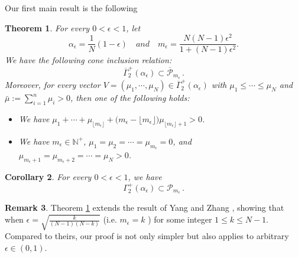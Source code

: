 \documentclass[12pt, twoside]{article}
\newtheorem{theorem}{Theorem}[section]
\newtheorem{corollary}[theorem]{Corollary}
\theoremstyle{definition}
\newtheorem{definition}[theorem]{Definition}
\newtheorem{remark}[theorem]{Remark}
\numberwithin{equation}{section}
\def \a {\alpha }
\begin{document}
Our first main result is the following
\begin{theorem}\label{T1}
For every $0<\epsilon<1$, let
$$\a_{\epsilon}=\frac{1}{N}(1-\epsilon)\quad and\quad m_{\epsilon} =\frac{N(N-1)\epsilon^2}{1+(N-1)\epsilon^2}.$$
We have the following cone inclusion relation:
\begin{equation*}
\overline{\Gamma}^{+}_{2}(\alpha_{\epsilon})\subset \overline{\mathcal{P}}_{m_{\epsilon}}\,.
\end{equation*}
Moreover, for every vector $V=(\mu_{1},\cdots,\mu_{N})\in \overline{\Gamma}^{+}_{2}(\alpha_{\epsilon})$ with $\mu_{1}\leq\cdots\leq\mu_{N}$ and $\bar{\mu}:=\sum_{i=1}^{n}\mu_{i}>0$, then one of the following holds:
\begin{itemize}
\item[(1)] We have $\mu_{1}+\cdots+\mu_{\lfloor  m_{\epsilon}\rfloor}+\big(m_{\epsilon}-\lfloor m_{\epsilon}\rfloor\big)\mu_{\lfloor m_{\epsilon}\rfloor+1}> 0$.
\item[(2)] We have $m_{\epsilon}\in\mathbb{N}^{+}$, $\mu_{1}=\mu_{2}=\cdots=\mu_{ m_{\epsilon} }=0$, and $\mu_{ m_{\epsilon} +1}=\mu_{  m_{\epsilon} +2}=\cdots=\mu_{N}>0$.
\end{itemize}
\end{theorem}
\begin{corollary}\label{C2}
For every $0<\epsilon<1$, we have
\begin{equation*}
\Gamma^{+}_{2}(\alpha_{\epsilon})\subset {\mathcal{P}_{m_{\epsilon}}}\,.
\end{equation*} 
\end{corollary}
\begin{remark}
Theorem \ref{T1} extends the result of Yang and Zhang \cite[Lemma 2.4]{YZ25}, showing that when $\epsilon = \sqrt{\frac{k}{(N-1)(N-k)}}$ (i.e. $m_{\epsilon} = k$ ) for some integer $1\leq k\leq N-1$. Compared to theirs, our proof is not only simpler but also applies to arbitrary $\epsilon \in (0,1)$.
\end{remark}

\end{document}
